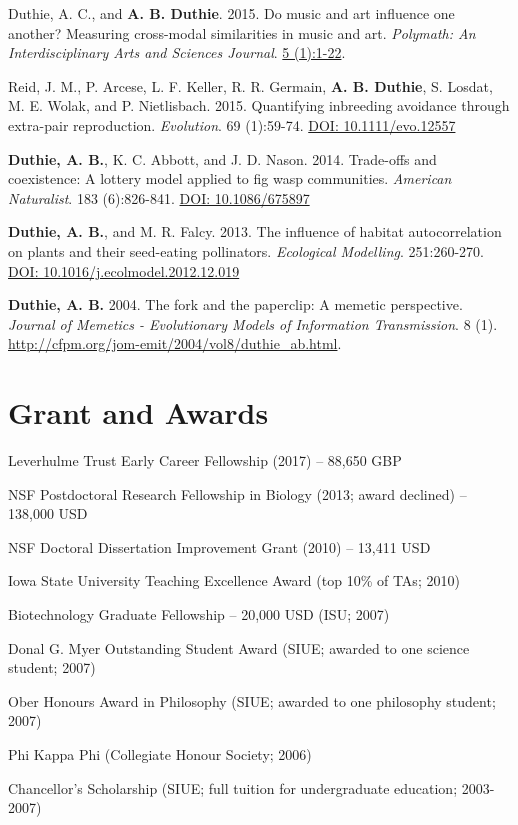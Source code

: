 \documentclass[letterpaper]{article}
\renewenvironment{itemize}{
  \begin{list}{}{
    \setlength{\leftmargin}{1.5em}
  }
}{
  \end{list}
}
\begin{document}
\begin{etaremune}
\item Duthie, A. C., and {\bf A. B. Duthie}. 2015. Do music and art influence one another? Measuring cross-modal similarities in music and art. {\it Polymath: An Interdisciplinary Arts and Sciences Journal}. \href{https://ojcs.siue.edu/ojs/index.php/polymath/article/view/3013}{5 (1):1-22}.
\item Reid, J. M., P. Arcese, L. F. Keller, R. R. Germain, {\bf A. B. Duthie}, S. Losdat, M. E. Wolak, and P. Nietlisbach. 2015. Quantifying inbreeding avoidance through extra-pair reproduction. {\it Evolution}. 69 (1):59-74. \href{http://onlinelibrary.wiley.com/doi/10.1111/evo.12557/abstract}{DOI: 10.1111/evo.12557}
\item {\bf Duthie, A. B.}, K. C. Abbott, and J. D. Nason. 2014. Trade-offs and coexistence: A lottery model applied to fig wasp communities. {\it American Naturalist}. 183 (6):826-841. \href{http://www.jstor.org/stable/10.1086/675897}{DOI: 10.1086/675897}
\item {\bf Duthie, A. B.}, and M. R. Falcy. 2013. The influence of habitat autocorrelation on plants and their seed-eating pollinators. {\it Ecological Modelling}. 251:260-270. \href{http://www.sciencedirect.com/science/article/pii/S0304380013000021}{DOI: 10.1016/j.ecolmodel.2012.12.019}
\item {\bf Duthie, A. B.} 2004. The fork and the paperclip: A memetic perspective. {\it Journal of Memetics - Evolutionary Models of Information Transmission}. 8 (1). \href{http://cfpm.org/jom-emit/2004/vol8/duthie_ab.html}{http://cfpm.org/jom-emit/2004/vol8/duthie\_ab.html}.
\end{etaremune}

\section*{Grant and Awards}
\begin{itemize}
\item Leverhulme Trust Early Career Fellowship (2017) -- 88,650 GBP
\item NSF Postdoctoral Research Fellowship in Biology (2013; award declined) -- 138,000 USD
\item NSF Doctoral Dissertation Improvement Grant (2010) -- 13,411 USD
\item Iowa State University Teaching Excellence Award (top 10\% of TAs; 2010)
\item Biotechnology Graduate Fellowship -- 20,000 USD (ISU; 2007)
\item Donal G. Myer Outstanding Student Award (SIUE; awarded to one science student; 2007)
\item Ober Honours Award in Philosophy (SIUE; awarded to one philosophy student; 2007)
\item Phi Kappa Phi (Collegiate Honour Society; 2006)
\item Chancellor's Scholarship (SIUE; full tuition for undergraduate education; 2003-2007)
\end{itemize}
\end{document}
